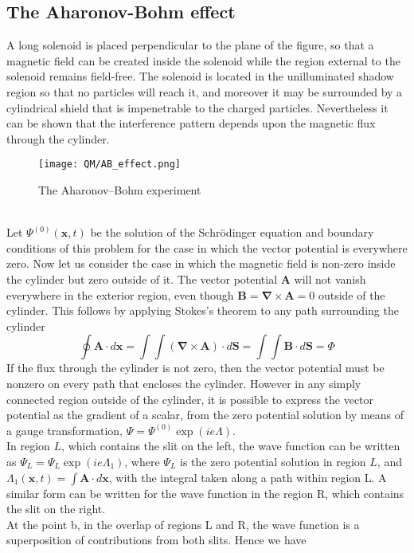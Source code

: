 \documentclass[cyan]{elegantnote}
\begin{document}
\subsection{The Aharonov-Bohm effect}
A long solenoid is placed perpendicular to the plane of the figure, so that a magnetic field can be created inside the solenoid while the region external to the solenoid remains field-free. The solenoid is located in the unilluminated shadow region so that no particles will reach it, and moreover it may be surrounded by a cylindrical shield that is impenetrable to the charged particles. Nevertheless it can be shown that the interference pattern depends upon the magnetic flux through the cylinder.\\
\begin{figure}[!h]
	\centering
	\texttt{[image: QM/AB\_effect.png]}
	\caption{The Aharonov–Bohm experiment}
\end{figure}\\
Let $\Psi^{(0)}(\bm{x},t)$ be the solution of the Schrödinger equation and boundary conditions of this problem for the case in which the vector potential is everywhere zero. Now let us consider the case in which the magnetic field is non-zero inside the cylinder but zero outside of it. The vector potential $\bm{A}$ will not vanish everywhere in the exterior region, even though $\bm{B}=\bm{\nabla}\times\bm{A}=0$
outside of the cylinder. This follows by applying Stokes's theorem to any path surrounding the cylinder
\[\oint \bm{A}\cdot d\bm{x} = \int\int (\bm{\nabla}\times\bm{A})\cdot d\bm{S} = \int\int \bm{B}\cdot d\bm{S} = \Phi\]
If the flux through the cylinder is not zero, then the vector potential must be nonzero on every path that encloses the cylinder. However in any simply connected region outside of the cylinder, it is possible to express the vector potential as the gradient of a scalar, from the zero potential solution by means of a gauge transformation, $\Psi = \Psi^{(0)}\exp(ie\Lambda)$.\\
In region $L$, which contains the slit on the left, the wave function can be written as $\Psi_L = \Psi_L\exp(ie\Lambda_1)$, where $\Psi_L$ is the zero potential solution in region $L$, and $\Lambda_1(\bm{x},t) = \int \bm{A}\cdot d\bm{x}$, with the integral taken along a path within region L. A similar form can be written for the wave function in the region R, which contains the slit on the right. \\
At the point b, in the overlap of regions L and R, the wave function is a superposition of contributions from both slits. Hence we have
\end{document}
